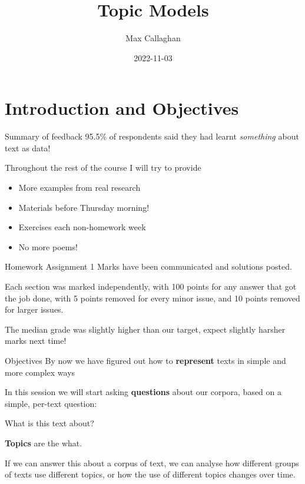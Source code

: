 \documentclass[
  10pt,
  ignorenonframetext,
  aspectratio=169]{beamer}
\title{Topic Models}
\author{Max Callaghan}
\date{2022-11-03}
\providecommand{\tightlist}{%
  \setlength{\itemsep}{0pt}\setlength{\parskip}{0pt}}
\begin{document}
\frame{\titlepage}

\hypertarget{introduction-and-objectives}{%
\section{Introduction and
Objectives}\label{introduction-and-objectives}}

\begin{frame}{Summary of feedback}
\protect\hypertarget{summary-of-feedback}{}
95.5\% of respondents said they had learnt \emph{something} about text
as data!

Throughout the rest of the course I will try to provide

\begin{itemize}
\tightlist
\item
  More examples from real research
\item
  Materials before Thursday morning!
\item
  Exercises each non-homework week
\item
  No more poems!
\end{itemize}
\end{frame}

\begin{frame}{Homework Assignment 1}
\protect\hypertarget{homework-assignment-1}{}
Marks have been communicated and solutions posted.

Each section was marked independently, with 100 points for any answer
that got the job done, with 5 points removed for every minor issue, and
10 points removed for larger issues.

The median grade was slightly higher than our target, expect slightly
harsher marks next time!
\end{frame}

\begin{frame}{Objectives}
\protect\hypertarget{objectives}{}
By now we have figured out how to \textbf{represent} texts in simple and
more complex ways

In this session we will start asking \textbf{questions} about our
corpora, based on a simple, per-text question:

What is this text about?

\textbf{Topics} are the what.

If we can answer this about a corpus of text, we can analyse how
different groups of texts use different topics, or how the use of
different topics changes over time.
\end{frame}
\end{document}
